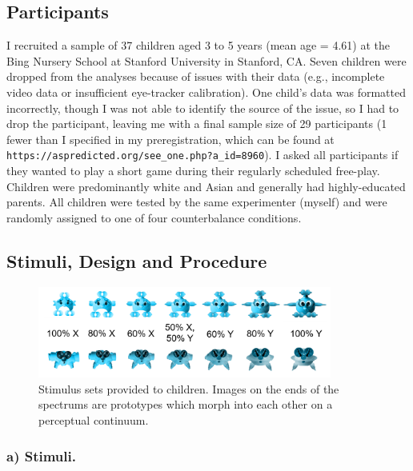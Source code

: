 \documentclass[,man,floatsintext]{apa6}
\begin{document}
\hypertarget{participants}{%
\subsection{Participants}\label{participants}}

I recruited a sample of 37 children aged 3 to 5 years (mean age = 4.61) at the Bing Nursery School at Stanford University in Stanford, CA. Seven children were dropped from the analyses because of issues with their data (e.g., incomplete video data or insufficient eye-tracker calibration). One child's data was formatted incorrectly, though I was not able to identify the source of the issue, so I had to drop the participant, leaving me with a final sample size of 29 participants (1 fewer than I specified in my preregistration, which can be found at \texttt{https://aspredicted.org/see\_one.php?a\_id=8960}). I asked all participants if they wanted to play a short game during their regularly scheduled free-play. Children were predominantly white and Asian and generally had highly-educated parents. All children were tested by the same experimenter (myself) and were randomly assigned to one of four counterbalance conditions.

\hypertarget{stimuli-design-and-procedure}{%
\subsection{Stimuli, Design and Procedure}\label{stimuli-design-and-procedure}}

\begin{figure}

{\centering \includegraphics[width=3.8in]{../images/stimuli_1} 

}

\caption{Stimulus sets provided to children. Images on the ends of the spectrums are prototypes which morph into each other on a perceptual continuum.}\label{fig:stimuli}
\end{figure}

\hypertarget{a-stimuli.}{%
\subsubsection{a) Stimuli.}\label{a-stimuli.}}
\end{document}
